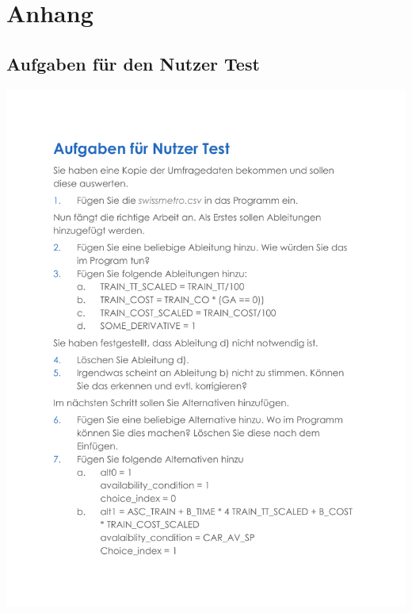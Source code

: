 \documentclass{article}
\begin{document}
\section{Anhang} \label{anhang}
\subsection{Aufgaben für den Nutzer Test}
\includegraphics[width=1\textwidth,height=1\textheight]{ressources/aufgaben.pdf}
\newpage
\end{document}
